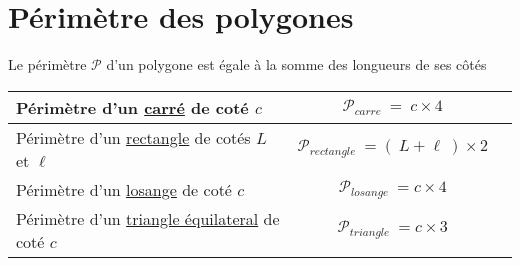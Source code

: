 \documentclass[11pt]{article}
\begin{document}
\section{Périmètre des polygones}


\begin{definition}
Le périmètre $\mathcal{P}$ d'un polygone est égale à la somme des
longueurs de ses côtés
\end{definition}

\begin{exemple} {\large
  \begin{center}
  \begin{tabular}{|l|c|c|}
\hline
Périmètre d'un \underline{carré} de coté $c$ &  $\mathcal{P}_{carre}~=~c \times 4$ \\ \hline
Périmètre d'un \underline{rectangle} de cotés $L$ et $\ell$ &  $\mathcal{P}_{rectangle}~=(~L+\ell~) \times 2$ \\ \hline
Périmètre d'un \underline{losange} de coté $c$ &  $\mathcal{P}_{losange}~=c \times 4$ \\ \hline
Périmètre d'un \underline{triangle équilateral} de coté $c$ \phantom{00} &  $\mathcal{P}_{triangle}~=c \times 3$ \\ \hline
\end{tabular} 
\end{center} }
\end{exemple}
\end{document}
